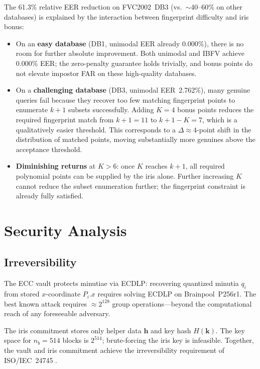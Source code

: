 The 61.3\% relative EER reduction on FVC2002~DB3 (vs.\ $\sim$40--60\% on
other databases) is explained by the interaction between fingerprint difficulty
and iris bonus:

\begin{itemize}
  \item On an \textbf{easy database} (DB1, unimodal EER already 0.000\%), there
  is no room for further absolute improvement. Both unimodal and IBFV achieve
  0.000\% EER; the zero-penalty guarantee holds trivially, and bonus points do
  not elevate impostor FAR on these high-quality databases.
  \item On a \textbf{challenging database} (DB3, unimodal EER~2.762\%), many genuine
  queries fail because they recover too few matching fingerprint points to
  enumerate $k{+}1$ subsets successfully. Adding $K = 4$ bonus points reduces the
  required fingerprint match from $k{+}1 = 11$ to $k{+}1{-}K = 7$, which is a
  qualitatively easier threshold. This corresponds to a $\Delta \approx 4$-point
  shift in the distribution of matched points, moving substantially more genuines
  above the acceptance threshold.
  \item \textbf{Diminishing returns} at $K > 6$: once $K$ reaches $k{+}1$, all
  required polynomial points can be supplied by the iris alone. Further increasing
  $K$ cannot reduce the subset enumeration further; the fingerprint constraint
  is already fully satisfied.
\end{itemize}

\section{Security Analysis}
\label{sec:security_analysis}

\subsection{Irreversibility}
\label{sec:irreversibility}

The ECC vault protects minutiae via ECDLP: recovering quantized minutia $q_i$
from stored $x$-coordinate $P_i.x$ requires solving ECDLP on Brainpool~P256r1.
The best known attack requires $\approx 2^{128}$ group operations---beyond the
computational reach of any foreseeable adversary.

The iris commitment stores only helper data $\mathbf{h}$ and key hash $H(\mathbf{k})$.
The key space for $n_b = 514$ blocks is $2^{514}$; brute-forcing the iris key
is infeasible. Together, the vault and iris commitment achieve the irreversibility
requirement of ISO/IEC~24745 \cite{iso24745}.

